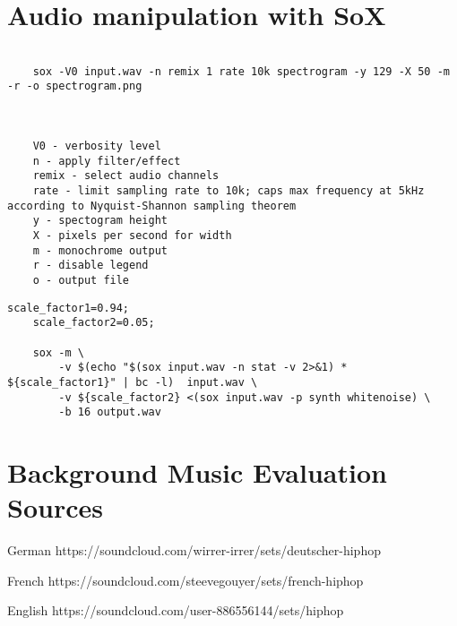 \begin{appendices}
\section{Audio manipulation with SoX}
\label{sec:appendix_a}

    \begin{lstlisting}[caption={Generating monochrome spectrograms with SoX}, label={lst:spectrograms}]
    
    sox -V0 input.wav -n remix 1 rate 10k spectrogram -y 129 -X 50 -m -r -o spectrogram.png
    
    
    
    V0 - verbosity level 
    n - apply filter/effect
    remix - select audio channels
    rate - limit sampling rate to 10k; caps max frequency at 5kHz according to Nyquist-Shannon sampling theorem
    y - spectogram height
    X - pixels per second for width
    m - monochrome output
    r - disable legend
    o - output file
    \end{lstlisting}
    
    \begin{lstlisting}[caption=Adding white noise to an audio file]
    scale_factor1=0.94; 
    scale_factor2=0.05;
     
    sox -m \
        -v $(echo "$(sox input.wav -n stat -v 2>&1) * ${scale_factor1}" | bc -l)  input.wav \
        -v ${scale_factor2} <(sox input.wav -p synth whitenoise) \
        -b 16 output.wav
   \end{lstlisting}
   
\section{Background Music Evaluation Sources}
German
https://soundcloud.com/wirrer-irrer/sets/deutscher-hiphop

French
https://soundcloud.com/steevegouyer/sets/french-hiphop

English 
https://soundcloud.com/user-886556144/sets/hiphop
\end{appendices}